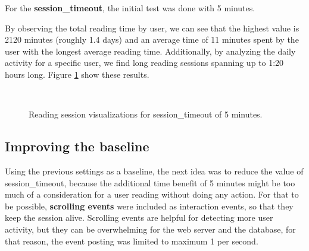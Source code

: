 For the \textbf{session\_timeout}, the initial test was done with 5 minutes.

By observing the total reading time by user, we can see that the highest value is 2120 minutes (roughly 1.4 days) and an average time of 11 minutes spent by the user with the longest average reading time. Additionally, by analyzing the daily activity for a specific user, we find long reading sessions spanning up to 1:20 hours long. Figure \ref{fig:visualizations_1st_iteration} show these results.

\begin{figure}[bth]
	\myfloatalign
	 \quad 
	 \\
	 \quad
	\caption{Reading session visualizations for session\_timeout of 5 minutes.}\label{fig:visualizations_1st_iteration}
\end{figure}


\subsection{Improving the baseline}
Using the previous settings as a baseline, the next idea was to reduce the value of session\_timeout, because the additional time benefit of 5 minutes might be too much of a consideration for a user reading without doing any action. For that to be possible, \textbf{scrolling events} were included as interaction events, so that they keep the session alive. Scrolling events are helpful for detecting more user activity, but they can be overwhelming for the web server and the database, for that reason, the event posting was limited to maximum 1 per second.

